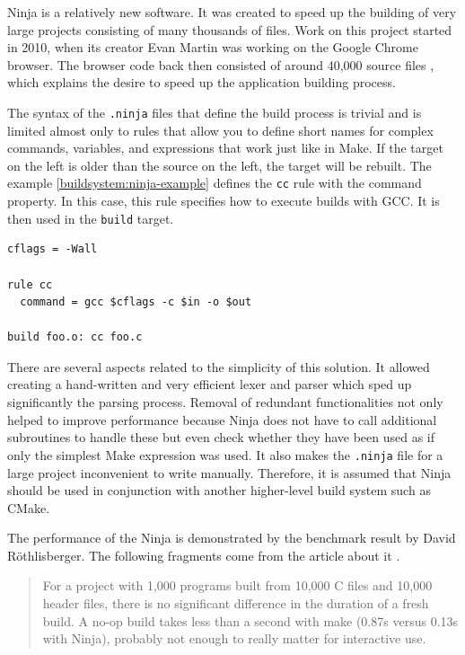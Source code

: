 Ninja is a relatively new software. It was created to speed up the
building of very large projects consisting of many thousands of files.
Work on this project started in 2010, when its creator Evan Martin was
working on the Google Chrome browser. The browser code back then
consisted of around 40,000 source files \cite{NINJACHROME}, which explains the desire to
speed up the application building process.

The syntax of the \texttt{.ninja} files that define the build process is trivial
and is limited almost only to rules that allow you to define short names
for complex commands, variables, and expressions that work just like
in Make. If the target on the left is older than the source on the left,
the target will be rebuilt.
The example \ref{buildsystem:ninja-example} defines the \texttt{cc} rule with the command property.
In this case, this rule specifies how to execute builds with GCC.
It is then used in the \texttt{build} target.

\begin{lstlisting}[caption={Example of \texttt{.ninja}}, label={buildsystem:ninja-example}, caption={%
  Example of simple \texttt{.ninja} file \cite{NINJAFILE}%
}]
cflags = -Wall

rule cc
  command = gcc $cflags -c $in -o $out

build foo.o: cc foo.c
\end{lstlisting}

There are several aspects related to the simplicity of this solution. It
allowed creating a hand-written and very efficient lexer and parser
which sped up significantly the parsing process. Removal of redundant
functionalities not only helped to improve performance because Ninja does
not have to call additional subroutines to handle these but even check
whether they have been used as if only the simplest Make expression was
used. It also makes the \texttt{.ninja} file for a large project inconvenient to
write manually. Therefore, it is assumed that Ninja should be used in
conjunction with another higher-level build system such as CMake.

The performance of the Ninja is demonstrated by the benchmark result by
David Röthlisberger. The following fragments come from the article about it \cite{BENCHMARK}.

\begin{quote}
For a project with 1,000 programs built from 10,000 C files and 10,000
header files, there is no significant difference in the duration of a
fresh build. A no-op build takes less than a second with make (0.87s
versus 0.13s with Ninja), probably not enough to really matter for
interactive use.
\end{quote}

